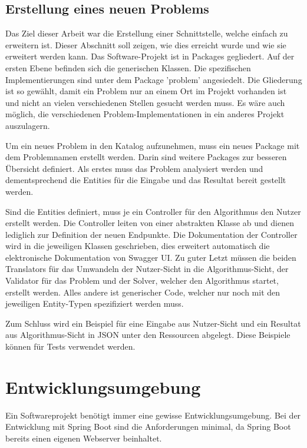 \FloatBarrier

\subsection{Erstellung eines neuen Problems}
Das Ziel dieser Arbeit war die Erstellung einer Schnittstelle, welche einfach zu erweitern ist. Dieser Abschnitt soll zeigen, wie dies erreicht wurde und wie sie erweitert werden kann. Das 
Software-Projekt ist in Packages gegliedert. Auf der ersten Ebene befinden sich die generischen Klassen. Die spezifischen Implementierungen sind unter dem Package 'problem'  angesiedelt. 
Die Gliederung ist so gewählt, damit ein Problem nur an einem Ort im Projekt vorhanden ist und nicht an vielen verschiedenen Stellen gesucht werden muss. Es wäre auch möglich, 
die verschiedenen Problem-Implementationen in ein anderes Projekt auszulagern.

Um ein neues Problem in den Katalog aufzunehmen, muss ein neues Package mit dem Problemnamen erstellt werden. Darin sind weitere Packages zur besseren Übersicht definiert. Als 
erstes muss das Problem analysiert werden und dementsprechend die Entities für die Eingabe und das Resultat bereit gestellt werden.

Sind die Entities definiert, muss je ein Controller für den Algorithmus den Nutzer erstellt werden. Die Controller leiten von einer abstrakten Klasse ab und dienen lediglich zur Definition
der neuen Endpunkte. Die Dokumentation der Controller wird in die jeweiligen Klassen geschrieben, dies erweitert automatisch die elektronische Dokumentation von Swagger UI. 
Zu guter Letzt müssen die beiden Translators für das Umwandeln der Nutzer-Sicht in die Algorithmus-Sicht, der Validator für das Problem und der Solver, welcher den Algorithmus 
startet, erstellt werden. Alles andere ist generischer Code, welcher nur noch mit den jeweiligen Entity-Typen spezifiziert werden muss.

Zum Schluss wird ein Beispiel für eine Eingabe aus Nutzer-Sicht und ein Resultat aus Algorithmus-Sicht in JSON unter den Ressourcen abgelegt. Diese Beispiele können für Tests 
verwendet werden.

\newpage

\section{Entwicklungsumgebung}\label{entwicklungsumgebung}
Ein Softwareprojekt benötigt immer eine gewisse Entwicklungsumgebung. Bei der Entwicklung mit Spring Boot sind die Anforderungen minimal, da Spring Boot bereits einen eigenen Webserver 
beinhaltet.

